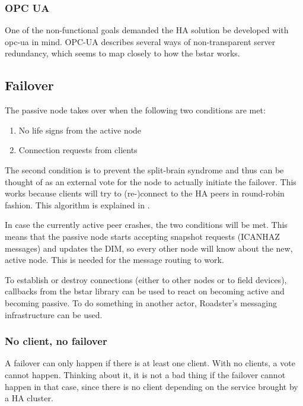 \subsubsection{OPC UA}
One of the non-functional goals demanded the HA solution be developed with
\gls{opc-ua} in mind. OPC-UA describes several ways of non-transparent server
redundancy, which seems to map closely to how the \gls{bstar} works.

\subsection{Failover}
The passive node takes over when the following two conditions are met:

\begin{enumerate}
\item No life signs from the active node
\item Connection requests from clients
\end{enumerate}

The second condition is to prevent the split-brain syndrome and thus can be
thought of as an external vote for the node to actually initiate the failover.
This works because clients will try to (re-)connect to the HA peers in
round-robin fashion.  This algorithm is explained in \cite[Chapter 4 - Reliable
Request-Reply Patterns, Client-Side Reliability (Lazy Pirate
Pattern)]{zmq:zguide}.

In case the currently active peer crashes, the two conditions will be met.
This means that the passive node starts accepting snapshot requests (ICANHAZ
messages) and updates the DIM, so every other node will know about the new,
active node. This is needed for the message routing to work.

To establish or destroy connections (either to other nodes or to field
devices), callbacks from the \gls{bstar} library can be used to react on
becoming active and becoming passive. To do something in another actor,
Roadster's messaging infrastructure can be used.





\subsubsection{No client, no failover}
A failover can only happen if there is at least one client. With no clients, a
vote cannot happen. Thinking about it, it is not a bad thing if the failover
cannot happen in that case, since there is no client depending on the service
brought by a HA cluster.

